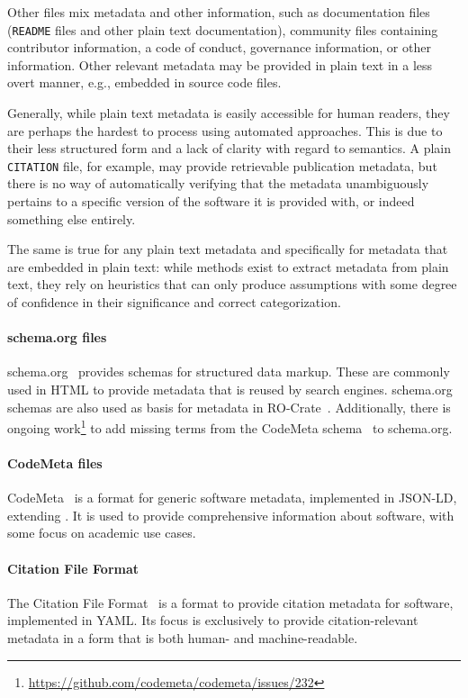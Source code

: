 \documentclass[11pt,a4paper]{scrartcl}
\newcommand{\fn}[1]{\texttt{#1}}
\begin{document}
Other files mix metadata and other information, such as documentation files (\fn{README} files and other plain text documentation),
community files containing contributor information, a code of conduct, governance information, or other information.
Other relevant metadata may be provided in plain text in a less overt manner, e.g., embedded in source code files. 

Generally, while plain text metadata is easily accessible for human readers, they are perhaps the hardest to process using
automated approaches. This is due to their less structured form and a lack of clarity with regard to semantics. A plain 
\fn{CITATION} file, for example, may provide retrievable publication metadata, but there is no way of automatically verifying
that the metadata unambiguously pertains to a specific version of the software it is provided with, or indeed something
else entirely. 

The same is true for any plain text metadata and specifically for metadata that are embedded in plain text: while methods
exist to extract metadata from plain text, they rely on heuristics that can only produce assumptions with some degree of
confidence in their significance and correct categorization.

\paragraph{schema.org files}\label{par:metadata-formats-schema-org}
schema.org~\cite{SchemaOrg} provides schemas for structured data markup. These are commonly used in HTML to provide metadata that is reused by search engines. schema.org schemas are also used as basis for metadata in RO-Crate~\cite{RO-Crate}. Additionally, there is ongoing work\footnote{\url{https://github.com/codemeta/codemeta/issues/232}} to add missing terms from the CodeMeta schema~\cite{CodeMetaSchema} to schema.org.

\paragraph{CodeMeta files}\label{par:metadata-formats-codemeta}
CodeMeta~\cite{CodeMetaSchema} is a format for generic software metadata, implemented in JSON-LD, extending . It is used to provide comprehensive information about software, with some focus on academic use cases.

\paragraph{Citation File Format}\label{par:metadata-formats-cff}
The Citation File Format~\cite{CffSchema} is a format to provide citation metadata for software, implemented in YAML. Its focus is exclusively to provide citation-relevant metadata in a form that is both human- and machine-readable.
\end{document}
